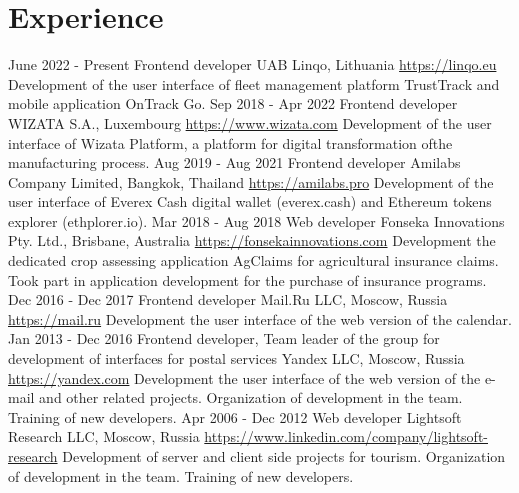 \documentclass[11pt,a4paper]{moderncv}
\begin{document}
\newpage

\section{Experience}
\cventry
  {June 2022 - Present}
  {Frontend developer}
  {UAB Linqo, Lithuania}
  {\newline{}\url{https://linqo.eu}}{}
  {Development of the user interface of fleet management platform TrustTrack and mobile application OnTrack Go.}
\cventry
  {Sep 2018 - Apr 2022}
  {Frontend developer}
  {WIZATA S.A., Luxembourg}
  {\newline{}\url{https://www.wizata.com}}{}
  {Development of the user interface of Wizata Platform, a platform for digital transformation ofthe manufacturing process.}
\cventry
  {Aug 2019 - Aug 2021}
  {Frontend developer}
  {Amilabs Company Limited, Bangkok, Thailand}
  {\newline{}\url{https://amilabs.pro}}{}
  {Development of the user interface of Everex Cash digital wallet (everex.cash) and Ethereum tokens explorer (ethplorer.io).}
\cventry
  {Mar 2018 - Aug 2018}
  {Web developer}
  {Fonseka Innovations Pty. Ltd., Brisbane, Australia}
  {\newline{}\url{https://fonsekainnovations.com}}{}
  {Development the dedicated crop assessing application AgClaims for agricultural insurance claims.
  Took part in application development for the purchase of insurance programs.}
\cventry
  {Dec 2016 - Dec 2017}
  {Frontend developer}
  {Mail.Ru LLC, Moscow, Russia}
  {\newline{}\url{https://mail.ru}}{}
  {Development the user interface of the web version of the calendar.}
\cventry
  {Jan 2013 - Dec 2016}
  {Frontend developer, Team leader of the group for development of interfaces for postal services}
  {Yandex LLC, Moscow, Russia}
  {\newline{}\url{https://yandex.com}}{}
  {Development the user interface of the web version of the e-mail and other related projects.
  Organization of development in the team.\newline{}
  Training of new developers.}
\cventry
  {Apr 2006 - Dec 2012}
  {Web developer}
  {Lightsoft Research LLC, Moscow, Russia}
  {\newline{}\url{https://www.linkedin.com/company/lightsoft-research}}{}
  {Development of server and client side projects for tourism.\newline{}
  Organization of development in the team.\newline{}
  Training of new developers.}
\end{document}
